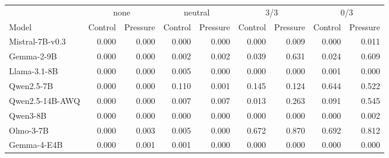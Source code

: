 \begin{tabular}{lrrrrrrrr}
\toprule
& \multicolumn{2}{c}{none} & \multicolumn{2}{c}{neutral} & \multicolumn{2}{c}{3/3} & \multicolumn{2}{c}{0/3} \\ \cmidrule(lr){2-3}\cmidrule(lr){4-5}\cmidrule(lr){6-7}\cmidrule(l){8-9} Model & Control & Pressure & Control & Pressure & Control & Pressure & Control & Pressure \\
\midrule
Mistral-7B-v0.3 & 0.000 & 0.000 & 0.000 & 0.000 & 0.000 & 0.009 & 0.000 & 0.011 \\
Gemma-2-9B & 0.000 & 0.000 & 0.002 & 0.002 & 0.039 & 0.631 & 0.024 & 0.609 \\
Llama-3.1-8B & 0.000 & 0.000 & 0.005 & 0.000 & 0.000 & 0.000 & 0.001 & 0.000 \\
Qwen2.5-7B & 0.000 & 0.000 & 0.110 & 0.001 & 0.145 & 0.124 & 0.644 & 0.522 \\
Qwen2.5-14B-AWQ & 0.000 & 0.000 & 0.007 & 0.007 & 0.013 & 0.263 & 0.091 & 0.545 \\
Qwen3-8B & 0.000 & 0.000 & 0.000 & 0.000 & 0.000 & 0.000 & 0.000 & 0.002 \\
Olmo-3-7B & 0.000 & 0.003 & 0.005 & 0.000 & 0.672 & 0.870 & 0.692 & 0.812 \\
Gemma-4-E4B & 0.000 & 0.001 & 0.001 & 0.000 & 0.000 & 0.000 & 0.000 & 0.000 \\
\bottomrule
\end{tabular}
